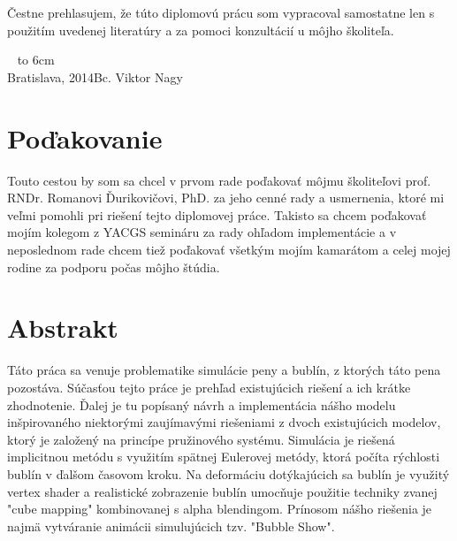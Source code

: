 \documentclass[12pt, a4paper, oneside]{book}
\newcommand\mfauthor{Bc. Viktor Nagy}
\newcommand\mfplacedate{Bratislava, 2014}
\begin{document}

\thispagestyle{empty}


\begin{figure}[H]
\begin{center}
\label{img:zadanie}
\end{center}
\end{figure}

{~}\vspace{12cm}

\noindent
\begin{minipage}{0.25\textwidth}~\end{minipage}
\begin{minipage}{0.75\textwidth}
Čestne prehlasujem, že túto diplomovú prácu som vypracoval samostatne len s použitím uvedenej literatúry a za pomoci konzultácií u môjho školiteľa.
\newline \newline
\end{minipage}
\vfill
~ \hfill {\hbox to 6cm{\dotfill}} \\
\mfplacedate \hfill \mfauthor
\vfill\eject 

\chapter*{Poďakovanie}\label{chap:thank_you}
Touto cestou by som sa chcel v prvom rade poďakovať môjmu školiteľovi prof. RNDr. Romanovi Ďurikovičovi, PhD. za jeho cenné rady a usmernenia, ktoré mi veľmi pomohli pri riešení tejto diplomovej práce. Takisto sa chcem poďakovať mojím kolegom z YACGS semináru za rady ohľadom implementácie a v neposlednom rade chcem tiež poďakovať všetkým mojím kamarátom a celej mojej rodine za podporu počas môjho štúdia. 
\vfill\eject 

\chapter*{Abstrakt}\label{chap:abstract_sk}
Táto práca sa venuje problematike simulácie peny a bublín, z ktorých táto pena pozostáva. Súčasťou tejto práce je prehľad existujúcich riešení a ich krátke zhodnotenie. Ďalej je tu popísaný návrh a implementácia nášho modelu inšpirovaného niektorými zaujímavými riešeniami z dvoch existujúcich modelov, ktorý je založený na princípe pružinového systému. Simulácia je riešená implicitnou metódu s využitím spätnej Eulerovej metódy, ktorá počíta rýchlosti bublín v ďalšom časovom kroku. Na deformáciu dotýkajúcich sa bublín je využitý vertex shader a realistické zobrazenie bublín umocňuje použitie techniky zvanej "cube mapping" kombinovanej s alpha blendingom. Prínosom nášho riešenia je najmä vytváranie animácii simulujúcich tzv. "Bubble Show".
\end{document}
